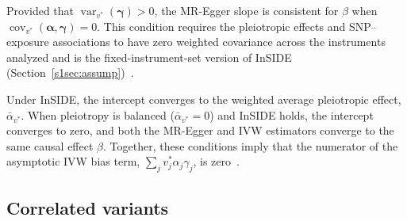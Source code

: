 \noindent Provided that $\operatorname{var}_{v^*}(\boldsymbol{\gamma})>0$, the MR-Egger slope is consistent for $\beta$ when $\operatorname{cov}_{v^*}(\boldsymbol{\alpha},\boldsymbol{\gamma})=0$. This condition requires the pleiotropic effects and SNP--exposure associations to have zero weighted covariance across the instruments analyzed and is the fixed-instrument-set version of InSIDE (Section~\ref{s1sec:assump})~\cite{burgess2017interpreting,dudbridge2025grip}.

\noindent Under InSIDE, the intercept converges to the weighted average pleiotropic effect, $\bar{\alpha}_{v^*}$. When pleiotropy is balanced ($\bar{\alpha}_{v^*}=0$) and InSIDE holds, the intercept converges to zero, and both the MR-Egger and IVW estimators converge to the same causal effect $\beta$. Together, these conditions imply that the numerator of the asymptotic IVW bias term, $\sum_j v_j^*\alpha_j\gamma_j$, is zero~\cite{burgess2017interpreting}.

\subsection*{Correlated variants}
\label{s1sec:corr}

